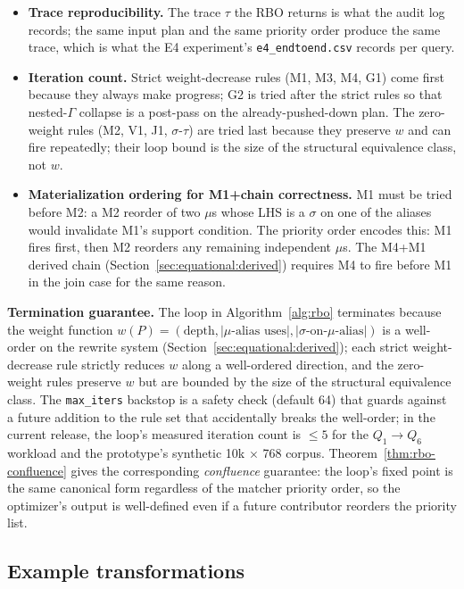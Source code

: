 \documentclass[sigconf,nonacm,review]{acmart}
\theoremstyle{plain}
\theoremstyle{definition}
\theoremstyle{remark}
\begin{document}
\begin{itemize}[leftmargin=*]
  \item \textbf{Trace reproducibility.} The trace
  $\tau$ the RBO returns is what the audit log records;
  the same input plan and the same priority order
  produce the same trace, which is what the
  E4 experiment's \texttt{e4\_endtoend.csv} records
  per query.
  \item \textbf{Iteration count.} Strict weight-decrease
  rules (M1, M3, M4, G1) come first because they
  always make progress; G2 is tried after the strict
  rules so that nested-$\Gamma$ collapse is a
  post-pass on the already-pushed-down plan. The
  zero-weight rules (M2, V1, J1, $\sigma$-$\tau$) are
  tried last because they preserve $w$ and can fire
  repeatedly; their loop bound is the size of the
  structural equivalence class, not $w$.
  \item \textbf{Materialization ordering for
  M1+chain correctness.} M1 must be tried before
  M2: a M2 reorder of two $\mu$s whose LHS is a
  $\sigma$ on one of the aliases would invalidate
  M1's support condition. The priority order
  encodes this: M1 fires first, then M2 reorders
  any remaining independent $\mu$s. The M4+M1
  derived chain
  (Section~\ref{sec:equational:derived}) requires
  M4 to fire before M1 in the join case for the
  same reason.
\end{itemize}

\noindent\textbf{Termination guarantee.}
The loop in Algorithm~\ref{alg:rbo} terminates
because the weight function
$w(P) = (\text{depth}, |\mu\text{-alias uses}|,
|\sigma\text{-on-}\mu\text{-alias}|)$ is a
well-order on the rewrite system
(Section~\ref{sec:equational:derived}); each strict
weight-decrease rule strictly reduces $w$ along a
well-ordered direction, and the zero-weight rules
preserve $w$ but are bounded by the size of the
structural equivalence class. The
\texttt{max\_iters} backstop is a safety check
(default 64) that guards against a future
addition to the rule set that accidentally breaks
the well-order; in the current release, the
loop's measured iteration count is $\le 5$ for
the $Q_1 \to Q_6$ workload and the prototype's
synthetic 10k $\times$ 768 corpus. Theorem~\ref{thm:rbo-confluence}
gives the corresponding \emph{confluence}
guarantee: the loop's fixed point is the same
canonical form regardless of the matcher
priority order, so the optimizer's output is
well-defined even if a future contributor
reorders the priority list.

\subsection{Example transformations}
\end{document}
